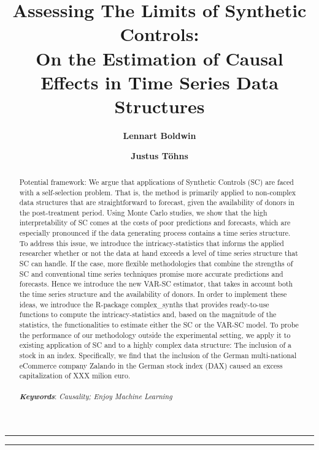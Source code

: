 \documentclass{article}
\author[1]{\textbf{Lennart Boldwin}}
\author[2]{\textbf{Justus Töhns}}
\affil[1,2]{ University of Cologne, Chair of Statistics and Econometrics \newline
	Supervised by Prof. Jörg Breitung
}
\title{\textbf{\huge Assessing The Limits of Synthetic Controls:}\\
	On the Estimation of Causal Effects in Time Series Data Structures}
\date{}
\begin{document}
	
	\pagestyle{headings}	
	\newpage
	\setcounter{page}{1}
	\renewcommand{\thepage}{\arabic{page}}
	
	
	
		
	\setlength{\parskip}{0.5em}
	
	\maketitle
	
	\noindent\rule{15cm}{0.5pt}
	\begin{abstract}
		Potential framework: We argue that applications of Synthetic Controls (SC) are faced with a self-selection problem. That is, the method is primarily applied to non-complex data structures that are straightforward to forecast, given the availability of donors in the post-treatment period. Using Monte Carlo studies, we show that the high interpretability of SC comes at the costs of poor predictions and forecasts, which are especially pronounced if the data generating process contains a time series structure. To address this issue, we introduce the intricacy-statistics that informs the applied researcher whether or not the data at hand exceeds a level of time series structure that SC can handle. If the case, more flexible methodologies that combine the strengths of SC and conventional time series techniques promise more accurate predictions and forecasts. Hence we introduce the new VAR-SC estimator, that takes in account both the time series structure and the availability of donors. In order to implement these ideas, we introduce the R-package complex\_synths that provides ready-to-use functions to compute the intricacy-statistics and, based on the magnitude of the statistics, the functionalities to estimate either the SC or the VAR-SC model. To probe the performance of our methodology outside the experimental setting, we apply it to existing application of SC and to a highly complex data structure: The inclusion of a stock in an index. Specifically, we find that the inclusion of the German multi-national eCommerce company Zalando in the German stock index (DAX) caused an excess capitalization of XXX milion euro.  \\ \\

		\textbf{\textit{Keywords}}: \textit{Causality; Enjoy Machine Learning}
	\end{abstract}
	\noindent\rule{15cm}{0.4pt}
	
\end{document}
